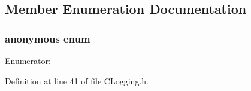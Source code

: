 \subsection{\-Member \-Enumeration \-Documentation}
\hypertarget{class_c_logging_ae762ada3dd0f62a8d5b371a97c87f33a}{\subsubsection[{anonymous enum}]{\setlength{\rightskip}{0pt plus 5cm}anonymous enum}}\label{class_c_logging_ae762ada3dd0f62a8d5b371a97c87f33a}
\begin{Desc}
\item[\-Enumerator\-: ]\par
\begin{description}
\item[{\em 
\hypertarget{class_c_logging_ae762ada3dd0f62a8d5b371a97c87f33aa6d749f333928bfa35bc5343aa4b19650}{\-F\-I\-L\-E\-\_\-\-F\-L\-U\-S\-H\-\_\-\-I\-N\-T\-E\-R\-V\-A\-L}\label{class_c_logging_ae762ada3dd0f62a8d5b371a97c87f33aa6d749f333928bfa35bc5343aa4b19650}
}]\end{description}
\end{Desc}



\-Definition at line 41 of file \-C\-Logging.\-h.

